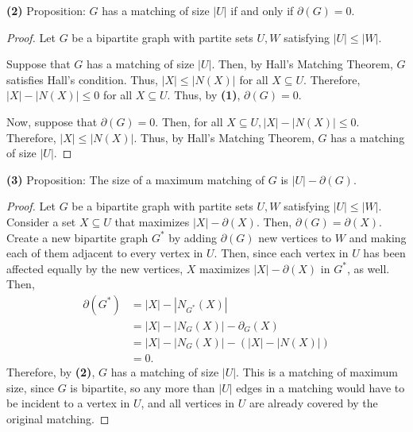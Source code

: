 \documentclass[12pt]{article}
\begin{document}
\noindent\textbf{(2)} Proposition: $G$ has a matching of size $|U|$ if and only if $\partial(G) = 0$.
\begin{proof}
	Let $G$ be a bipartite graph with partite sets $U,W$ satisfying $|U| \leq |W|$.
	
	Suppose that $G$ has a matching of size $|U|$.
	Then, by Hall's Matching Theorem, $G$ satisfies Hall's condition.
	Thus, $|X| \leq |N(X)|$ for all $X \subseteq U$.
	Therefore, $|X| - |N(X)| \leq 0$ for all $X \subseteq U$.
	Thus, by \textbf{(1)}, $\partial(G) = 0$.

	Now, suppose that $\partial(G) = 0$.
	Then, for all $X \subseteq U, |X| - |N(X)| \leq 0$.
	Therefore, $|X| \leq |N(X)|$.
	Thus, by Hall's Matching Theorem, $G$ has a matching of size $|U|$.
\end{proof}

\noindent\textbf{(3)} Proposition: The size of a maximum matching of $G$ is $|U| - \partial(G)$.
\begin{proof}
	Let $G$ be a bipartite graph with partite sets $U,W$ satisfying $|U| \leq |W|$.
	Consider a set $X \subseteq U$ that maximizes $|X| - \partial(X)$.
	Then, $\partial(G) = \partial(X)$.
	Create a new bipartite graph $G^*$ by adding $\partial(G)$ new vertices to $W$ and making each of them adjacent to every vertex in $U$.
	Then, since each vertex in $U$ has been affected equally by the new vertices, $X$ maximizes $|X| - \partial(X)$ in $G^*$, as well.
	Then,
	\begin{align*}
		\partial(G^*) &= |X| - |N_{G^*}(X)| \\
		              &= |X| - |N_G(X)| - \partial_G(X) \\
			      &= |X| - |N_G(X)| - (|X| - |N(X)|) \\
			      &= 0.
	\end{align*}
	Therefore, by \textbf{(2)}, $G$ has a matching of size $|U|$.
	This is a matching of maximum size, since $G$ is bipartite, so any more than $|U|$ edges in a matching would have to be incident to a vertex in $U$, and all vertices in $U$ are already covered by the original matching.
\end{proof}
\end{document}
